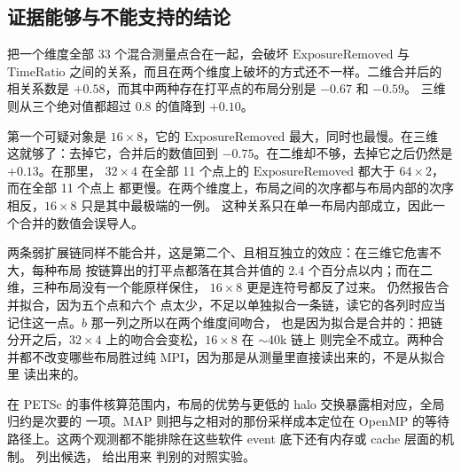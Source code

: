 \documentclass[11pt,a4paper,oneside]{report}
\let\OldSubsection\subsection
\renewcommand{\subsection}{\FloatBarrier\OldSubsection}
\begin{document}
\subsection{证据能够与不能支持的结论}
\label{sec:sync-limits}
把一个维度全部 33 个混合测量点合在一起，会破坏 $\mathrm{ExposureRemoved}$ 与
$\mathrm{TimeRatio}$ 之间的关系，而且在两个维度上破坏的方式还不一样。二维合并后的相关系数是 $+0.58$，而其中两种存在打平点的布局分别是 $-0.67$ 和 $-0.59$。
三维则从三个绝对值都超过 $0.8$ 的值降到 $+0.10$。

第一个可疑对象是 $16\times8$，它的 $\mathrm{ExposureRemoved}$ 最大，同时也最慢。在三维
这就够了：去掉它，合并后的数值回到 $-0.75$。在二维却不够，去掉它之后仍然是 $+0.13$。在那里，
$32\times4$ 在全部 11 个点上的 $\mathrm{ExposureRemoved}$ 都大于 $64\times2$，而在全部 11 个点上
都更慢。在两个维度上，布局之间的次序都与布局内部的次序相反，$16\times8$ 只是其中最极端的一例。
这种关系只在单一布局内部成立，因此一个合并的数值会误导人。

两条弱扩展链同样不能合并，这是第二个、且相互独立的效应：在三维它危害不大，每种布局
按链算出的打平点都落在其合并值的 2.4 个百分点以内；而在二维，三种布局没有一个能原样保住，
$16\times8$ 更是连符号都反了过来。 仍然报告合并拟合，因为五个点和六个
点太少，不足以单独拟合一条链，读它的各列时应当记住这一点。$b$ 那一列之所以在两个维度间吻合，
也是因为拟合是合并的：把链分开之后，$32\times4$ 上的吻合会变松，$16\times8$ 在 $\sim$40k 链上
则完全不成立。两种合并都不改变哪些布局胜过纯 MPI，因为那是从测量里直接读出来的，不是从拟合里
读出来的。

在 PETSc 的事件核算范围内，布局的优势与更低的 halo 交换暴露相对应，全局归约是次要的
一项。MAP 则把与之相对的那份采样成本定位在 OpenMP 的等待路径上。这两个观测都不能排除在这些软件
event 底下还有内存或 cache 层面的机制。 列出候选， 给出用来
判别的对照实验。
\end{document}
